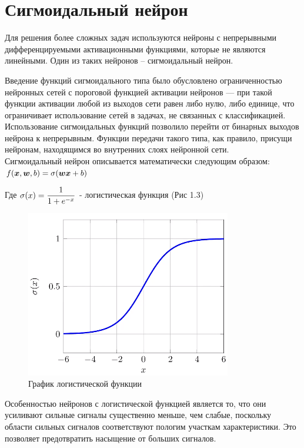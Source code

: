 \section{Сигмоидальный нейрон}

Для решения более сложных задач используются нейроны с непрерывными дифференцируемыми активационными функциями, которые не являются линейными. Один из таких нейронов – сигмоидальный нейрон.

Введение функций сигмоидального типа было обусловлено ограниченностью нейронных сетей с пороговой функцией активации нейронов — при такой функции активации любой из выходов сети равен либо нулю, либо единице, что ограничивает использование сетей в задачах, не связанных с классификацией. Использование сигмоидальных функций позволило перейти от бинарных выходов нейрона к непрерывным. Функции передачи такого типа, как правило, 
присущи нейронам, находящимся во внутренних слоях нейронной сети. \\

Сигмоидальный нейрон описывается математически следующим образом: \\

$
  f( \boldsymbol{x}, \boldsymbol{w}, b) = \sigma(\boldsymbol{wx} + b) \\
$

Где $ \mathlarger{\sigma(x) = \frac{1}{1 + e^{-x}}}$  - логистическая функция (Рис 1.3)

\begin{figure}[H]
  \centering
  \includegraphics[width=0.5\linewidth]{./img/sigma-func}
  \caption{График логистической функции}
  \label{fig:mpr}
\end{figure} 

Особенностью нейронов с логистической функцией является то, что они усиливают сильные сигналы существенно меньше, чем слабые, поскольку области сильных сигналов соответствуют пологим участкам характеристики. Это позволяет предотвратить насыщение от больших сигналов.

